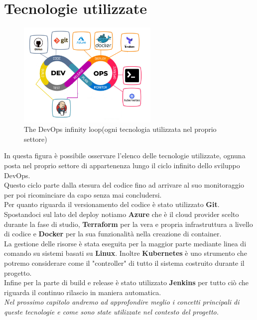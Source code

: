 \documentclass[a4paper,12pt]{report}
\begin{document}
\section{Tecnologie utilizzate}
\begin{figure}[h]
	\includegraphics[width=0.6\textwidth]{tech_used}
    \caption{The DevOps infinity loop(ogni tecnologia utilizzata nel proprio settore) \cite{devopsloopimg}}
    \label{fig:tech_used}
\end{figure}
In questa figura è possibile osservare l'elenco delle tecnologie utilizzate, ognuna posta nel proprio settore di appartenenza lungo il ciclo infinito dello sviluppo DevOps.\cite{devopsloop}\\
Questo ciclo parte dalla stesura del codice fino ad arrivare al suo monitoraggio per poi ricominciare da capo senza mai concludersi.\\
Per quanto riguarda il versionamento del codice è stato utilizzato \textbf{Git}. \\
Spostandoci sul lato del deploy notiamo \textbf{Azure} che è il cloud provider scelto durante la fase di studio, \textbf{Terraform} per la vera e propria infrastruttura a livello di codice e \textbf{Docker} per la sua funzionalità nella creazione di container.\\
La gestione delle risorse è stata eseguita per la maggior parte mediante linea di comando su sistemi basati su \textbf{Linux}. Inoltre \textbf{Kubernetes} è uno strumento che potremo considerare come il "controller" di tutto il sistema costruito durante il progetto.\\
Infine per la parte di build e release è stato utilizzato \textbf{Jenkins} per tutto ciò che riguarda il continuo rilascio in maniera automatica.\\
\textit{Nel prossimo capitolo andremo ad approfondire meglio i concetti principali di queste tecnologie e come sono state utilizzate nel contesto del progetto.}
\end{document}
